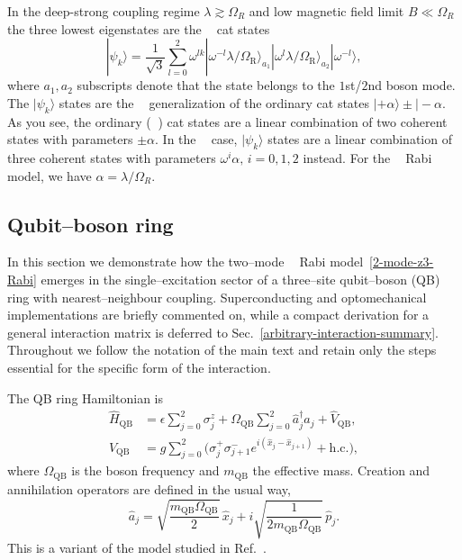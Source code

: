 \documentclass[reprint, aps, prx, amsmath, amssymb, longbibliography, superscriptaddress]{revtex4-2}
\DeclareMathOperator{\Zthree}{\mathbb{Z}_3}
\DeclareMathOperator{\Ztwo}{\mathbb{Z}_2}
\begin{document}
In the deep-strong coupling regime $\lambda \gtrsim \Omega_R$ and low magnetic field limit $ B \ll \Omega_R$ the three lowest eigenstates are the $\Zthree$ cat states
\begin{equation}
\label{three-cat-states}
    |\psi_k\rangle = \frac{1}{\sqrt{3}}\sum\limits_{l=0}^2 \omega^{lk}|\omega^{-l} \lambda/\Omega_{\text{R}}\rangle_{ a_1}|\omega^l \lambda/\Omega_{\text{R}}\rangle_{ a_2} |\omega^{-l} \rangle,
\end{equation}
where $a_1, a_2$ subscripts denote that the state belongs to the $1$st/$2$nd boson mode. The $|\psi_k\rangle$ states are the $\Zthree$ generalization of the ordinary cat states $|+\alpha\rangle \pm |-\alpha$. As you see, the ordinary ($\Ztwo$) cat states are a linear combination of two coherent states with parameters $\pm\alpha$. In the $\Zthree$ case, $|\psi_k\rangle$ states are a linear combination of three coherent states with parameters $\omega^i \alpha, \, i = 0,1,2$ instead. For the $\Zthree$ Rabi model, we have $\alpha = \lambda/\Omega_R$. 

\subsection{Qubit--boson ring}
\label{physical-implementation}

In this section we demonstrate how the two--mode $\Zthree$ Rabi model~\eqref{2-mode-z3-Rabi} emerges
in the single--excitation sector of a three--site qubit--boson (QB) ring with
nearest--neighbour coupling.  Superconducting and optomechanical
implementations are briefly commented on, while a compact derivation for a
general interaction matrix is deferred to
Sec.~\ref{arbitrary-interaction-summary}.  Throughout we follow the notation of the
main text and retain only the steps essential for the specific form of the
interaction.

The QB ring Hamiltonian is
\begin{equation}
\label{physical-hamiltonian}
  \begin{aligned}
    \hat H_{\text{QB}} &= \epsilon \sum_{j=0}^{2} \sigma_j^z
      + \Omega_{\text{QB}} \sum_{j=0}^{2} \hat a_j^{\dagger} \hat a_j
      + \hat V_{\text{QB}},
      \\
    \hat V_{\text{QB}} &= g \sum_{j=0}^{2}
      \bigl( \sigma_j^{+} \sigma_{j+1}^{-}
      e^{ i ( \hat x_j - \hat x_{j+1} ) } + \text{h.c.} \bigr),
  \end{aligned}
\end{equation}
where $\Omega_{\text{QB}}$ is the boson frequency and $m_{\text{QB}}$ the
effective mass.  Creation and annihilation operators are defined in the usual
way,
\begin{equation}
  \hat a_j = \sqrt{\frac{m_{\text{QB}} \Omega_{\text{QB}}}{2}}\, \hat x_j
           + i \sqrt{ \frac{1}{2 m_{\text{QB}} \Omega_{\text{QB}}} }\, \hat p_j.
\end{equation}
This is a variant of the model studied in
Ref.~\cite{sedov_chiral_2020}.
\end{document}
